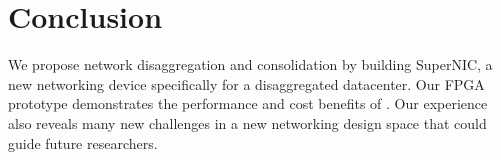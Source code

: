 \section{Conclusion}
\label{sec:snic:conclude}

We propose network disaggregation and consolidation by building SuperNIC, a new networking device specifically for a disaggregated datacenter.
Our FPGA prototype demonstrates the performance and cost benefits of \snic.
Our experience also reveals many new challenges in a new networking design space that could guide future researchers.